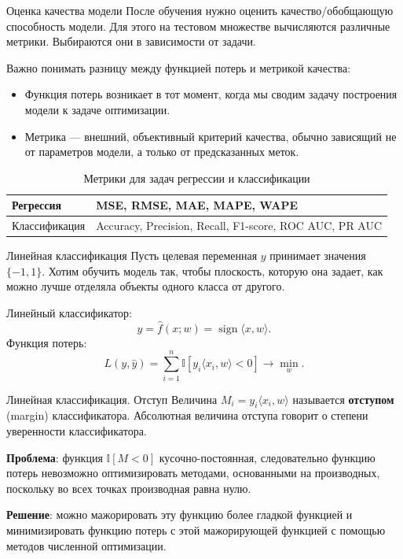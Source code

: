 \documentclass[notheorems, handout]{beamer}
\begin{document}
\begin{frame}{Оценка качества модели}
	После обучения нужно оценить качество/обобщающую способность модели. Для этого на тестовом множестве вычисляются различные метрики. Выбираются они в зависимости от задачи.\smallskip

	Важно понимать разницу между функцией потерь и метрикой качества:
	\begin{itemize}
		\item Функция потерь возникает в тот момент, когда мы сводим задачу построения модели к задаче оптимизации.
		\item Метрика — внешний, объективный критерий качества, обычно зависящий не от параметров модели, а только от предсказанных меток.
	\end{itemize}
	\begin{table}[h!]
		\centering
		\caption{Метрики для задач регрессии и классификации}
		\begin{tabular}{|p{3cm}|p{6cm}|}
			\hline
			Регрессия & MSE, RMSE, MAE, MAPE, WAPE \\
			\hline
			Классификация & Accuracy, Precision, Recall, F1-score, ROC AUC, PR AUC \\
			\hline
		\end{tabular}
	\end{table}\medskip
\end{frame}

\begin{frame}{Линейная классификация}
	Пусть целевая переменная $y$ принимает значения $\{-1, 1\}$. Хотим обучить модель так, чтобы плоскость, которую она задает, как можно лучше отделяла объекты одного класса от другого.\medskip

	Линейный классификатор:
	\[
		\hat y = \hat f(x; w) = \operatorname{sign} \langle x, w\rangle.
	\]
	Функция потерь:
	\[
		L(y, \hat{y}) = \sum_{i=1}^{n}\mathbb{I}[y_i \langle x_i, w\rangle < 0] \longrightarrow \min_{w}.
	\]
\end{frame}

\begin{frame}{Линейная классификация. Отступ}
	Величина $M_i=y_i \langle x_i, w\rangle$ называется \textbf{отступом} (margin) классификатора. Абсолютная величина отступа говорит о степени уверенности классификатора.\medskip

	\textbf{Проблема}: функция $\mathbb{I}[M < 0]$ кусочно-постоянная, следовательно функцию потерь невозможно оптимизировать методами, основанными на производных, поскольку во всех точках производная равна нулю.\medskip

	\textbf{Решение}: можно мажорировать эту функцию более гладкой функцией и минимизировать функцию потерь с этой мажорирующей функцией с помощью методов численной оптимизации.
\end{frame}
\end{document}
